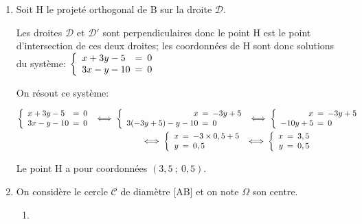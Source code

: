 \documentclass[10pt]{article}
\begin{document}
\begin{enumerate}
La droite $\mathcal{D}'$ a pour équation $3x-y-10=0$.

\item Soit H le projeté orthogonal de B sur la droite $\mathcal D$.

Les droites $\mathcal{D}$ et $\mathcal{D}'$ sont perpendiculaires donc le point H est le point d'intersection de ces deux droites; les coordonnées de H sont donc solutions du système:
$\left \lbrace
\begin{array}{l !{=} l}
x+3y-5 & 0\\
3x-y-10 & 0
\end{array}
\right .$



On résout ce système:

$\begin{gathered}\left \lbrace
\begin{array}{l !{=} l}
x+3y-5 & 0\\
3x-y-10 & 0
\end{array}
\right .
\iff
\left \lbrace
\begin{array}{r !{=} l}
x & - 3y+5 \\
3(-3y+5)-y-10 & 0
\end{array}
\right .
\iff
\left \lbrace
\begin{array}{r !{=} l}
x & - 3y+5 \\
-10y+5 & 0
\end{array}
\right .\\
\phantom{\left \lbrace
\begin{array}{l !{=} l}
x+3y-5 & 0\\
3x-y-10 & 0
\end{array}
\right .}
\iff
\left \lbrace
\begin{array}{r !{=} l}
x & - 3\times 0,5+5 \\
y & 0,5
\end{array}
\right .
\iff
\left \lbrace
\begin{array}{r !{=} l}
x & 3,5 \\
y & 0,5
\end{array}
\right .\end{gathered}$

Le point H a pour coordonnées $\left (3,5~;~0,5\right )$.

\item On considère le cercle $\mathcal C$ de diamètre [AB] et on note $\Omega$ son centre.
	\begin{enumerate}
		\item 
{}
\end{enumerate}
\end{enumerate}
\end{document}
